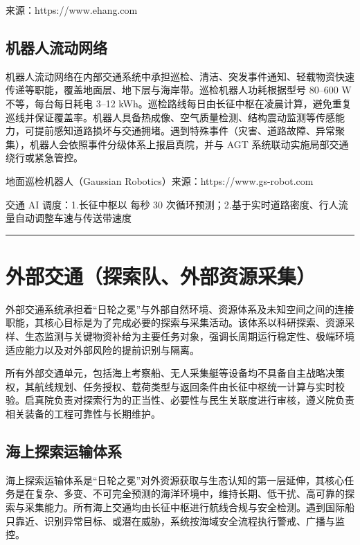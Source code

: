 来源：https://www.ehang.com

\subsection{机器人流动网络}\label{ux673aux5668ux4ebaux6d41ux52a8ux7f51ux7edc}

机器人流动网络在内部交通系统中承担巡检、清洁、突发事件通知、轻载物资快速传递等职能，覆盖地面层、地下层与海岸带。巡检机器人功耗根据型号 80--600 W 不等，每台每日耗电 3--12 kWh。巡检路线每日由长征中枢在凌晨计算，避免重复巡线并保证覆盖率。机器人具备热成像、空气质量检测、结构震动监测等传感能力，可提前感知道路损坏与交通拥堵。遇到特殊事件（灾害、道路故障、异常聚集），机器人会依照事件分级体系上报启真院，并与 AGT 系统联动实施局部交通绕行或紧急管控。

地面巡检机器人（Gaussian Robotics）来源：https://www.gs-robot.com

交通 AI 调度：1.长征中枢以 每秒 30 次循环预测；2.基于实时道路密度、行人流量自动调整车速与传送带速度

\begin{center}\rule{0.5\linewidth}{0.5pt}\end{center}

\section{外部交通（探索队、外部资源采集）}\label{ux5916ux90e8ux4ea4ux901aux63a2ux7d22ux961fux5916ux90e8ux8d44ux6e90ux91c7ux96c6}

外部交通系统承担着``日轮之冕''与外部自然环境、资源体系及未知空间之间的连接职能，其核心目标是为了完成必要的探索与采集活动。该体系以科研探索、资源采样、生态监测与关键物资补给为主要任务对象，强调长周期运行稳定性、极端环境适应能力以及对外部风险的提前识别与隔离。

所有外部交通单元，包括海上考察船、无人采集艇等设备均不具备自主战略决策权，其航线规划、任务授权、载荷类型与返回条件由长征中枢统一计算与实时校验。启真院负责对探索行为的正当性、必要性与民生关联度进行审核，遵义院负责相关装备的工程可靠性与长期维护。

\subsection{海上探索运输体系}\label{ux6d77ux4e0aux63a2ux7d22ux8fd0ux8f93ux4f53ux7cfb}

海上探索运输体系是``日轮之冕''对外资源获取与生态认知的第一层延伸，其核心任务是在复杂、多变、不可完全预测的海洋环境中，维持长期、低干扰、高可靠的探索与采集能力。所有海上交通均由长征中枢进行航线合规与安全检测。遇到国际船只靠近、识别异常目标、或潜在威胁，系统按海域安全流程执行警戒、广播与监控。

